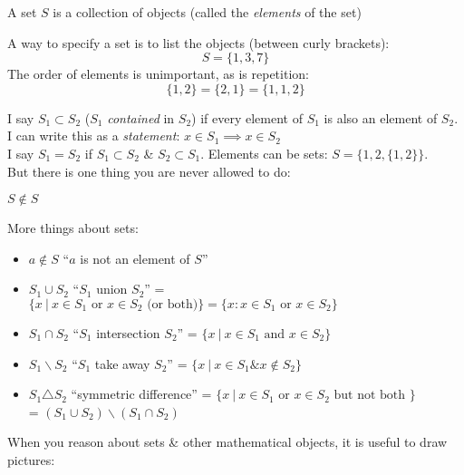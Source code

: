\documentclass[twoside]{scrartcl}
\begin{document}
\label{sub:sets}

A set $S$ is  a collection of objects (called the \emph{elements} of the set)\\
\begin{example}
A way to specify a set is to list the objects (between curly brackets):
\[S = \{1,3,7\}\]	
The order of elements is unimportant, as is repetition:
\[\{1,2\} = \{2,1\} = \{1,1,2\}\]
\end{example}

I say $S_1 \subset S_2$ ($S_1$ \emph{contained} in $S_2$) if every element of $S_1$ is also an element of $S_2$. I can write this as a \emph{statement}: $x \in S_1 \implies x \in S_2$\\

I say $S_1 = S_2$ if $S_1 \subset S_2$ \& $S_2 \subset S_1$. Elements can be sets: $S = \{1,2,\{1,2\}\}$.\\
 But there is one thing you are never allowed to do:\vspace*{5pt}

\begin{axiom}
$S \not \in S$	
\end{axiom}



More things about sets:
\begin{itemize}
\item $a \not \in S$ ``$a$ is not an element of $S$''
\item $S_1 \cup S_2$ ``$S_1$ union $S_2$'' = $\{x ~|~ x \in S_1 \text{ or } x \in S_2 \text{ (or both)}\} = \{x : x \in S_1 \text{ or } x \in S_2\}$
\item $S_1 \cap S_2$ ``$S_1$ intersection $S_2$'' = $\{x ~|~ x \in S_1 \text{ and } x \in S_2\}$
\item $S_1 \backslash S_2$ ``$S_1$ take away $S_2$'' = $\{x ~|~ x \in S_1 \& x \not \in S_2\}$
\item $S_1 \triangle S_2$ ``symmetric difference'' = $\{x ~|~ x \in S_1 \text{ or } x \in S_2 \text{ but not both }\}$\\ = $(S_1 \cup S_2) \backslash (S_1 \cap S_2)$
\end{itemize}

When you reason about sets \& other mathematical objects, it is useful to draw pictures:

\def\firstcircle{(0,0) circle (1cm)}
\def\secondcircle{(0:1.5cm) circle (1cm)}

\end{document}
